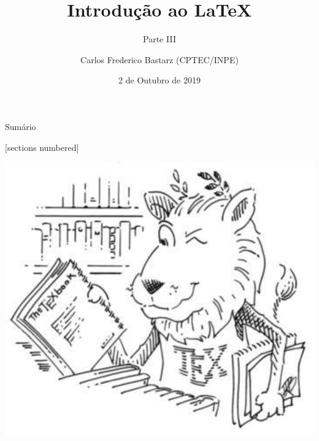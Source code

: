 \documentclass[10pt]{beamer}
\title{Introdução ao \LaTeX}
\subtitle{Parte III}
\date{2 de Outubro de 2019}
\author{Carlos Frederico Bastarz (CPTEC/INPE)}
\institute{Instituto Nacional de Pesquisas Espaciais (INPE)}
\begin{document}
\maketitle



\begin{frame}[c]{Sumário}
    \vspace{2em}
    \begin{multicols}{2}
        \begin{minipage}{0.49\textwidth}
           [sections numbered]
           \tableofcontents[hideallsubsections]
        \end{minipage}
        \begin{minipage}{0.49\textwidth}
            \includegraphics[width=\textwidth]{./figs/ctan_lion_350x350.pdf}
        \end{minipage}
    \end{multicols}
\end{frame}
\end{document}
